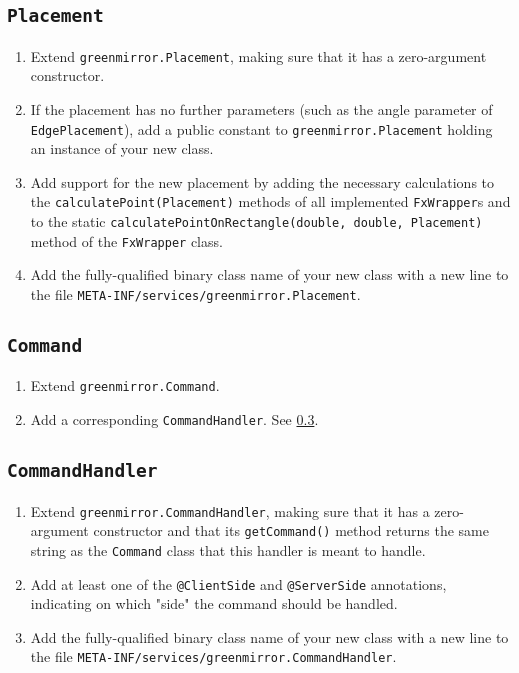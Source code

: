 \subsection{\texttt{Placement}}\label{app:ext;sub:placement}
\begin{enumerate}
  \item Extend \lstinline{greenmirror.Placement}, making sure that it has a zero-argument constructor.
  \item If the placement has no further parameters (such as the angle parameter of \lstinline{EdgePlacement}), add a public constant to \lstinline{greenmirror.Placement} holding an instance of your new class.
  \item Add support for the new placement by adding the necessary calculations to the \lstinline{calculatePoint(Placement)} methods of all implemented \lstinline{FxWrapper}s and to the static \lstinline{calculatePointOnRectangle(double, double, Placement)} method of the \lstinline{FxWrapper} class. 
  \item Add the fully-qualified binary class name of your new class with a new line to the file \lstinline{META-INF/services/greenmirror.Placement}.
\end{enumerate}
\subsection{\texttt{Command}}\label{app:ext;sub:command}
\begin{enumerate}
  \item Extend \lstinline{greenmirror.Command}.
  \item Add a corresponding \lstinline{CommandHandler}. See \cref{app:ext;sub:commandhandler}.
\end{enumerate}
\subsection{\texttt{CommandHandler}}\label{app:ext;sub:commandhandler}
\begin{enumerate}
  \item Extend \lstinline{greenmirror.CommandHandler}, making sure that it has a zero-argument constructor and that its \lstinline{getCommand()} method returns the same string as the \lstinline{Command} class that this handler is meant to handle.
  \item Add at least one of the \lstinline{@ClientSide} and \lstinline{@ServerSide} annotations, indicating on which "side" the command should be handled.
  \item Add the fully-qualified binary class name of your new class with a new line to the file \lstinline{META-INF/services/greenmirror.CommandHandler}.
\end{enumerate}

